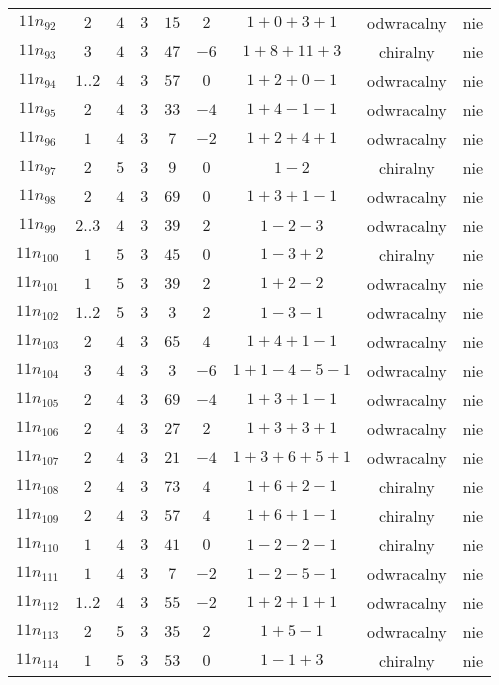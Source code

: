 \begin{longtable}{ccccccccc}
$11n_{92}$ & $2$ & $4$ & $3$ & $15$ & $2$ & $1+0+3+1$ & odwracalny & nie \\
$11n_{93}$ & $3$ & $4$ & $3$ & $47$ & $-6$ & $1+8+11+3$ & chiralny & nie \\
$11n_{94}$ & $1..2$ & $4$ & $3$ & $57$ & $0$ & $1+2+0-1$ & odwracalny & nie \\
$11n_{95}$ & $2$ & $4$ & $3$ & $33$ & $-4$ & $1+4-1-1$ & odwracalny & nie \\
$11n_{96}$ & $1$ & $4$ & $3$ & $7$ & $-2$ & $1+2+4+1$ & odwracalny & nie \\
$11n_{97}$ & $2$ & $5$ & $3$ & $9$ & $0$ & $1-2$ & chiralny & nie \\
$11n_{98}$ & $2$ & $4$ & $3$ & $69$ & $0$ & $1+3+1-1$ & odwracalny & nie \\
$11n_{99}$ & $2..3$ & $4$ & $3$ & $39$ & $2$ & $1-2-3$ & odwracalny & nie \\
$11n_{100}$ & $1$ & $5$ & $3$ & $45$ & $0$ & $1-3+2$ & chiralny & nie \\
$11n_{101}$ & $1$ & $5$ & $3$ & $39$ & $2$ & $1+2-2$ & odwracalny & nie \\
$11n_{102}$ & $1..2$ & $5$ & $3$ & $3$ & $2$ & $1-3-1$ & odwracalny & nie \\
$11n_{103}$ & $2$ & $4$ & $3$ & $65$ & $4$ & $1+4+1-1$ & odwracalny & nie \\
$11n_{104}$ & $3$ & $4$ & $3$ & $3$ & $-6$ & $1+1-4-5-1$ & odwracalny & nie \\
$11n_{105}$ & $2$ & $4$ & $3$ & $69$ & $-4$ & $1+3+1-1$ & odwracalny & nie \\
$11n_{106}$ & $2$ & $4$ & $3$ & $27$ & $2$ & $1+3+3+1$ & odwracalny & nie \\
$11n_{107}$ & $2$ & $4$ & $3$ & $21$ & $-4$ & $1+3+6+5+1$ & odwracalny & nie \\
$11n_{108}$ & $2$ & $4$ & $3$ & $73$ & $4$ & $1+6+2-1$ & chiralny & nie \\
$11n_{109}$ & $2$ & $4$ & $3$ & $57$ & $4$ & $1+6+1-1$ & chiralny & nie \\
$11n_{110}$ & $1$ & $4$ & $3$ & $41$ & $0$ & $1-2-2-1$ & chiralny & nie \\
$11n_{111}$ & $1$ & $4$ & $3$ & $7$ & $-2$ & $1-2-5-1$ & odwracalny & nie \\
$11n_{112}$ & $1..2$ & $4$ & $3$ & $55$ & $-2$ & $1+2+1+1$ & odwracalny & nie \\
$11n_{113}$ & $2$ & $5$ & $3$ & $35$ & $2$ & $1+5-1$ & odwracalny & nie \\
$11n_{114}$ & $1$ & $5$ & $3$ & $53$ & $0$ & $1-1+3$ & chiralny & nie \\

\end{longtable}
